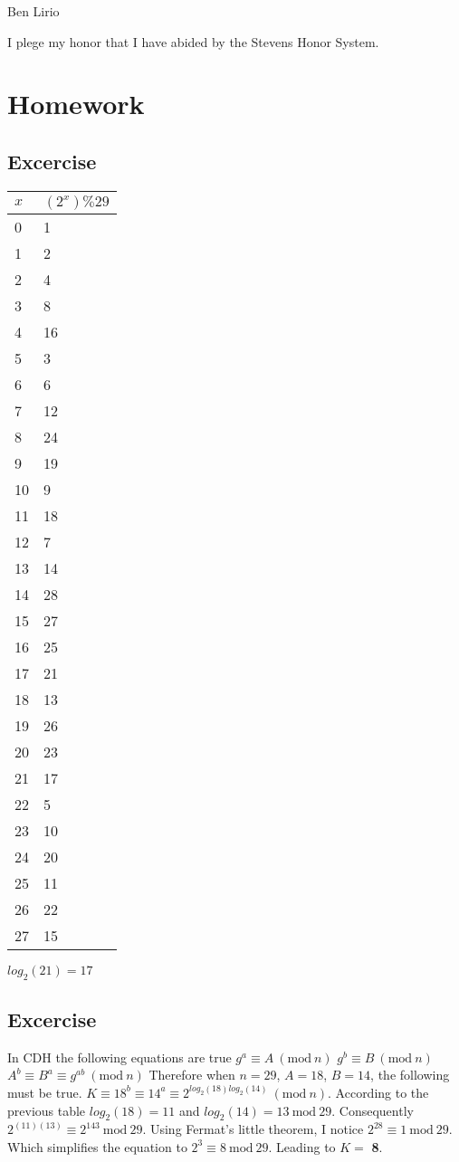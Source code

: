 \documentclass{article}
\begin{document}
Ben Lirio

I plege my honor that I have abided by the Stevens Honor System.
\setcounter{section}{4}
\section{Homework}
\subsection{Excercise}
\begin{center}
\begin{tabular}{|ll|}
\hline
	$x$ & $(2^{x})\%29$  \\
\hline
	0 & 1 \\
	1 & 2 \\
	2 & 4 \\
	3 & 8 \\
	4 & 16 \\
	5 & 3 \\
	6 & 6 \\
	7 & 12 \\
	8 & 24 \\
	9 & 19 \\
	10 & 9 \\
	11 & 18 \\
	12 & 7 \\
	13 & 14 \\
	14 & 28 \\
	15 & 27 \\
	16 & 25 \\
	17 & 21 \\
	18 & 13 \\
	19 & 26 \\
	20 & 23 \\
	21 & 17 \\
	22 & 5 \\
	23 & 10 \\
	24 & 20 \\
	25 & 11 \\
	26 & 22 \\
	27 & 15 \\
\hline
\end{tabular}
\end{center}
$log_{2}(21) = 17$
\subsection{Excercise}
In CDH the following equations are true
\newline
$g^a \equiv A\ (\textrm{mod}\ n)$
\newline
$g^b \equiv B\ (\textrm{mod}\ n)$
\newline
$A^b \equiv B^a \equiv g^{ab}\ (\textrm{mod}\ n)$
\newline
Therefore when $n = 29$, $A = 18$, $B = 14$, the following must be true. $K \equiv 18^b \equiv 14^a \equiv 2^{log_2(18)log_2(14)}\ (\textrm{mod}\ n)$. According to the previous table $log_2(18) = 11$ and $log_2(14) = 13\ \textrm{mod}\ 29$. Consequently $2^{(11)(13)} \equiv 2^{143}\ \textrm{mod}\ 29$. Using Fermat's little theorem, I notice $2^{28} \equiv 1\ \textrm{mod}\ 29$. Which simplifies the equation to $2^{3} \equiv 8\ \textrm{mod}\ 29$. Leading to $K =$ \textbf{8}.
\end{document}
